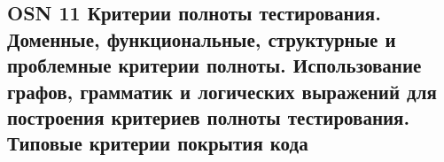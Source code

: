 \subsection{OSN 11 Критерии полноты тестирования. Доменные, функциональные, структурные и проблемные критерии полноты. Использование графов, грамматик
и логических выражений для построения критериев полноты тестирования. Типовые критерии покрытия кода}
